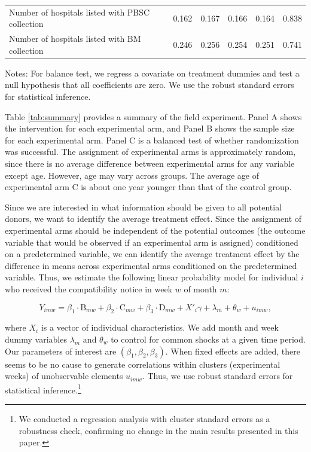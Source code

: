 \documentclass[
]{article}
\begin{document}
\begin{table}
\begin{threeparttable}
\begin{tabular}[t]{lccccc}
\hspace{1em}Number of hospitals listed with PBSC collection & 0.162 & 0.167 & 0.166 & 0.164 & 0.838\\
\hspace{1em}Number of hospitals listed with BM collection & 0.246 & 0.256 & 0.254 & 0.251 & 0.741\\
\bottomrule
\end{tabular}
\begin{tablenotes}
\item Notes: For balance test, we regress a covariate on treatment dummies and test a null hypothesis that all coefficients are zero. We use the robust standard errors for statistical inference.
\end{tablenotes}
\end{threeparttable}
\end{table}

Table \ref{tab:summary} provides a summary of the field experiment. Panel A shows the intervention for each experimental arm, and Panel B shows the sample size for each experimental arm. Panel C is a balanced test of whether randomization was successful. The assignment of experimental arms is approximately random, since there is no average difference between experimental arms for any variable except age. However, age may vary across groups. The average age of experimental arm C is about one year younger than that of the control group.

Since we are interested in what information should be given to all potential donors, we want to identify the average treatment effect. Since the assignment of experimental arms should be independent of the potential outcomes (the outcome variable that would be observed if an experimental arm is assigned) conditioned on a predetermined variable, we can identify the average treatment effect by the difference in means across experimental arms conditioned on the predetermined variable. Thus, we estimate the following linear probability model for individual \(i\) who received the compatibility notice in week \(w\) of month \(m\):

\begin{equation}
  Y_{imw} =
  \beta_1 \cdot \text{B}_{mw} + \beta_2 \cdot \text{C}_{mw} + \beta_3 \cdot \text{D}_{mw}
  + X'_i \gamma + \lambda_m + \theta_w + u_{imw}, \label{eq:reg}
\end{equation}

where \(X_i\) is a vector of individual characteristics. We add month and week dummy variables \(\lambda_m\) and \(\theta_w\) to control for common shocks at a given time period. Our parameters of interest are \((\beta_1, \beta_2, \beta_3)\). When fixed effects are added, there seems to be no cause to generate correlations within clusters (experimental weeks) of unobservable elements \(u_{imw}\). Thus, we use robust standard errors for statistical inference.\footnote{We conducted a regression analysis with cluster standard errors as a robustness check, confirming no change in the main results presented in this paper.}
\end{document}
